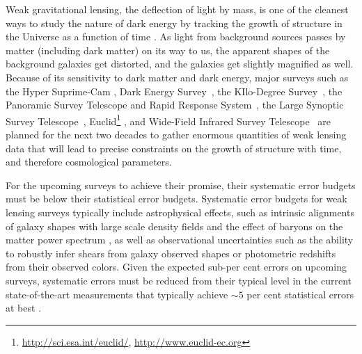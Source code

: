 \documentclass[twocolumn,useAMS,usenatbib]{mn2e}
\newcommand{\rachel}[1]{{\textcolor{red}{#1}}}
\begin{document}
Weak gravitational lensing, the deflection of light by mass, is one of the cleanest ways to study the nature of dark energy by tracking the growth of structure in the Universe as a function of time \citep[e.g.,][]{2001PhR...340..291B,2006astro.ph..9591A,2013PhR...530...87W}.
As light from background sources passes by matter (including dark matter) on its way to us, the apparent shapes of the background galaxies get distorted, and the galaxies get slightly magnified as well.
Because of its sensitivity to dark matter and dark energy, major surveys such as the Hyper Suprime-Cam \citep[HSC;][]{HSC_Overview}, Dark Energy Survey~\citep[DES;][]{DESC}, the KIlo-Degree Survey~\citep[KIDS;][]{KIDS}, the Panoramic Survey Telescope and Rapid Response System~\citep[PanSTARRS;][]{PanSTARRS_2010},
the Large Synoptic Survey Telescope~\citep[LSST;][]{LSST_Book}, Euclid\footnote{\url{http://sci.esa.int/euclid/}, \url{http://www.euclid-ec.org}} \citep{EuclidReport},
and Wide-Field Infrared Survey Telescope~\citep[WFIRST;][]{WFIRST_Final}
are planned for the next two decades to gather enormous quantities of weak lensing data that will lead to precise constraints on the growth of structure with time, and therefore cosmological parameters.

For the upcoming surveys to achieve their promise, their systematic error budgets must be below their statistical error budgets.
Systematic error budgets for weak lensing surveys typically include
astrophysical effects, such as intrinsic alignments of galaxy shapes
with large scale density fields \citep[e.g.,][]{2014arXiv1407.6990T} and the effect of baryons on the
matter power spectrum \citep[e.g.,][]{2011MNRAS.415.3649V}, as well as observational uncertainties such as
the ability to robustly infer shears from galaxy observed shapes or
photometric redshifts from their observed colors. 
Given the expected sub-per cent errors on upcoming surveys, systematic errors must be reduced from
 their typical level in the current state-of-the-art
 measurements that typically achieve $\sim 5$ per cent statistical
 errors at best
 \citep[e.g.,][]{2010A&A...516A..63S,2013MNRAS.432.2433H,2013ApJ...765...74J,2013MNRAS.432.1544M}.
\end{document}
